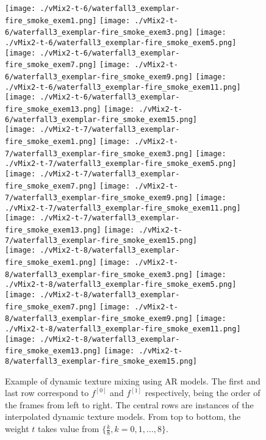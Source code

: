\begin{figure}[ht!]
{\vspace{1mm}
    \texttt{[image: ./vMix2-t-6/waterfall3\_exemplar-fire\_smoke\_exem1.png]}
    \texttt{[image: ./vMix2-t-6/waterfall3\_exemplar-fire\_smoke\_exem3.png]}
    \texttt{[image: ./vMix2-t-6/waterfall3\_exemplar-fire\_smoke\_exem5.png]}
    \texttt{[image: ./vMix2-t-6/waterfall3\_exemplar-fire\_smoke\_exem7.png]}
    \texttt{[image: ./vMix2-t-6/waterfall3\_exemplar-fire\_smoke\_exem9.png]}
    \texttt{[image: ./vMix2-t-6/waterfall3\_exemplar-fire\_smoke\_exem11.png]}
    \texttt{[image: ./vMix2-t-6/waterfall3\_exemplar-fire\_smoke\_exem13.png]}
    \texttt{[image: ./vMix2-t-6/waterfall3\_exemplar-fire\_smoke\_exem15.png]} \\
\vspace{1mm}
    \texttt{[image: ./vMix2-t-7/waterfall3\_exemplar-fire\_smoke\_exem1.png]}
    \texttt{[image: ./vMix2-t-7/waterfall3\_exemplar-fire\_smoke\_exem3.png]}
    \texttt{[image: ./vMix2-t-7/waterfall3\_exemplar-fire\_smoke\_exem5.png]}
    \texttt{[image: ./vMix2-t-7/waterfall3\_exemplar-fire\_smoke\_exem7.png]}
    \texttt{[image: ./vMix2-t-7/waterfall3\_exemplar-fire\_smoke\_exem9.png]}
    \texttt{[image: ./vMix2-t-7/waterfall3\_exemplar-fire\_smoke\_exem11.png]}
    \texttt{[image: ./vMix2-t-7/waterfall3\_exemplar-fire\_smoke\_exem13.png]}
    \texttt{[image: ./vMix2-t-7/waterfall3\_exemplar-fire\_smoke\_exem15.png]} \\
\vspace{1mm}
    \texttt{[image: ./vMix2-t-8/waterfall3\_exemplar-fire\_smoke\_exem1.png]}
    \texttt{[image: ./vMix2-t-8/waterfall3\_exemplar-fire\_smoke\_exem3.png]}
    \texttt{[image: ./vMix2-t-8/waterfall3\_exemplar-fire\_smoke\_exem5.png]}
    \texttt{[image: ./vMix2-t-8/waterfall3\_exemplar-fire\_smoke\_exem7.png]}
    \texttt{[image: ./vMix2-t-8/waterfall3\_exemplar-fire\_smoke\_exem9.png]}
    \texttt{[image: ./vMix2-t-8/waterfall3\_exemplar-fire\_smoke\_exem11.png]}
    \texttt{[image: ./vMix2-t-8/waterfall3\_exemplar-fire\_smoke\_exem13.png]}
    \texttt{[image: ./vMix2-t-8/waterfall3\_exemplar-fire\_smoke\_exem15.png]} \\
}
    \caption{
        Example of dynamic texture mixing using AR models. The first and last row correspond to $f^{[0]}$ and $f^{[1]}$ respectively, being the order of the frames from left to right.
        The central rows are instances of the interpolated dynamic texture models.
        From top to bottom, the weight $t$ takes value from $\{\frac{k}{8}, k = 0, 1, \ldots, 8\}$.
    }
\label{fig:dynamic-mix-ar}
\end{figure}
